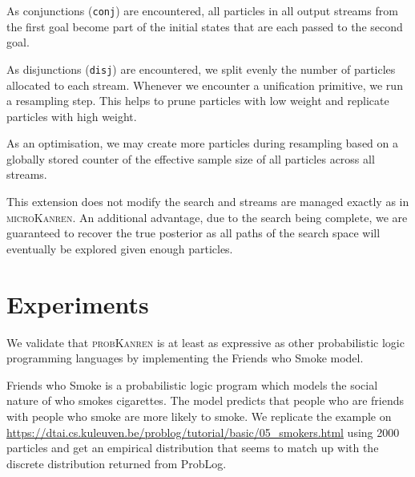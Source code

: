 \documentclass[
]{ceurart}
\begin{document}
As conjunctions (\texttt{conj}) are encountered, all particles in all
output streams from the first goal become part of the initial states
that are each passed to the second goal.

As disjunctions (\texttt{disj}) are encountered, we split evenly the
number of particles allocated to each stream. Whenever we encounter a
unification primitive, we run a resampling step. This helps to prune
particles with low weight and replicate particles with high weight.

As an optimisation, we may create more particles during resampling
based on a globally stored counter of the effective sample size of
all particles across all streams.

This extension does not modify the search and streams are managed
exactly as in \textsc{microKanren}. An additional advantage, due to
the  search being complete, we are guaranteed to
recover the true posterior as all paths of the search space will
eventually be explored given enough particles.

\section{Experiments}

We validate that \textsc{probKanren} is at least as expressive as other probabilistic
logic programming languages by implementing the Friends who Smoke model.

Friends who Smoke is a probabilistic logic program which models the
social nature of who smokes cigarettes. The model predicts that people
who are friends with people who smoke are more likely to smoke. We
replicate the example on
\url{https://dtai.cs.kuleuven.be/problog/tutorial/basic/05_smokers.html}
using 2000 particles and get an empirical distribution that seems to
match up with the discrete distribution returned from ProbLog.



\end{document}
